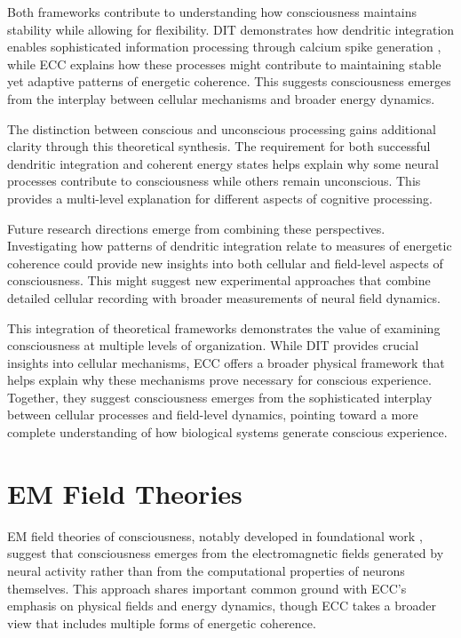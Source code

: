 \begin{refsection}
Both frameworks contribute to understanding how consciousness maintains stability while allowing for flexibility. DIT demonstrates how dendritic integration enables sophisticated information processing through calcium spike generation \cite{Major2013}, while ECC explains how these processes might contribute to maintaining stable yet adaptive patterns of energetic coherence. This suggests consciousness emerges from the interplay between cellular mechanisms and broader energy dynamics.

The distinction between conscious and unconscious processing gains additional clarity through this theoretical synthesis. The requirement for both successful dendritic integration and coherent energy states helps explain why some neural processes contribute to consciousness while others remain unconscious. This provides a multi-level explanation for different aspects of cognitive processing.

Future research directions emerge from combining these perspectives. Investigating how patterns of dendritic integration relate to measures of energetic coherence could provide new insights into both cellular and field-level aspects of consciousness. This might suggest new experimental approaches that combine detailed cellular recording with broader measurements of neural field dynamics.

This integration of theoretical frameworks demonstrates the value of examining consciousness at multiple levels of organization. While DIT provides crucial insights into cellular mechanisms, ECC offers a broader physical framework that helps explain why these mechanisms prove necessary for conscious experience. Together, they suggest consciousness emerges from the sophisticated interplay between cellular processes and field-level dynamics, pointing toward a more complete understanding of how biological systems generate conscious experience.

\section{EM Field Theories}

EM field theories of consciousness, notably developed in foundational work \cite{McFadden2002, McFadden2020}, suggest that consciousness emerges from the electromagnetic fields generated by neural activity rather than from the computational properties of neurons themselves. This approach shares important common ground with ECC's emphasis on physical fields and energy dynamics, though ECC takes a broader view that includes multiple forms of energetic coherence.


\end{refsection}
